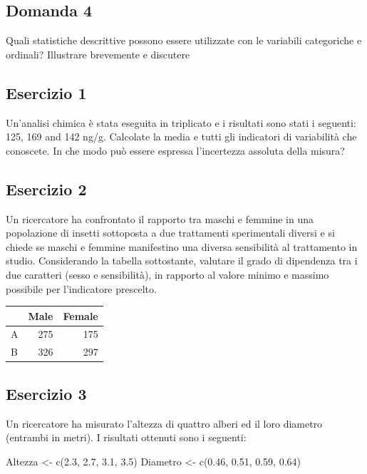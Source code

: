 \documentclass[a4paper,12pt,oneside]{book}
\newenvironment{Shaded}{\begin{snugshade}}{\end{snugshade}}
\newcommand{\FloatTok}[1]{#1}
\newcommand{\OtherTok}[1]{#1}
\newcommand{\FunctionTok}[1]{#1}
\newcommand{\NormalTok}[1]{#1}
\begin{document}
\hypertarget{domanda-4-1}{%
\subsection{Domanda 4}\label{domanda-4-1}}

Quali statistiche descrittive possono essere utilizzate con le variabili categoriche e ordinali? Illustrare brevemente e discutere

\hypertarget{esercizio-1-1}{%
\subsection{Esercizio 1}\label{esercizio-1-1}}

Un'analisi chimica è stata eseguita in triplicato e i risultati sono stati i seguenti: 125, 169 and 142 ng/g. Calcolate la media e tutti gli indicatori di variabilità che conoscete. In che modo può essere espressa l'incertezza assoluta della misura?

\hypertarget{esercizio-2-1}{%
\subsection{Esercizio 2}\label{esercizio-2-1}}

Un ricercatore ha confrontato il rapporto tra maschi e femmine in una popolazione di insetti sottoposta a due trattamenti sperimentali diversi e si chiede se maschi e femmine manifestino una diversa sensibilità al trattamento in studio. Considerando la tabella sottostante, valutare il grado di dipendenza tra i due caratteri (sesso e sensibilità), in rapporto al valore minimo e massimo possibile per l'indicatore prescelto.

\begin{tabular}{l|r|r}
\hline
  & Male & Female\\
\hline
A & 275 & 175\\
\hline
B & 326 & 297\\
\hline
\end{tabular}

\hypertarget{esercizio-3-1}{%
\subsection{Esercizio 3}\label{esercizio-3-1}}

Un ricercatore ha misurato l'altezza di quattro alberi ed il loro diametro (entrambi in metri). I risultati ottenuti sono i seguenti:

\begin{Shaded}
\begin{Highlighting}[]
\NormalTok{Altezza }\OtherTok{\textless{}{-}} \FunctionTok{c}\NormalTok{(}\FloatTok{2.3}\NormalTok{, }\FloatTok{2.7}\NormalTok{, }\FloatTok{3.1}\NormalTok{, }\FloatTok{3.5}\NormalTok{)}
\NormalTok{Diametro }\OtherTok{\textless{}{-}} \FunctionTok{c}\NormalTok{(}\FloatTok{0.46}\NormalTok{, }\FloatTok{0.51}\NormalTok{, }\FloatTok{0.59}\NormalTok{, }\FloatTok{0.64}\NormalTok{)}
\end{Highlighting}
\end{Shaded}
\end{document}
